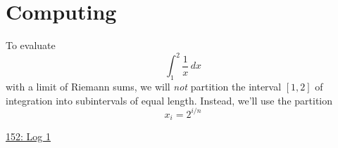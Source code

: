 \documentclass{ximera}
\begin{document}
\section{Computing}

To evaluate
\[
   \int_1^2 \frac{1}{x}\, dx
\]
with a limit of Riemann sums, we will \emph{not} partition the interval $[1,2]$ of integration into subintervals of equal length. Instead, we'll use the partition
\[
   x_i = 2^{i/n}
\]


\begin{onlineOnly}
    \begin{center}
\end{center}
\end{onlineOnly}

\href{https://www.desmos.com/calculator/rbcbxdrvcp}{152: Log 1}
\end{document}

